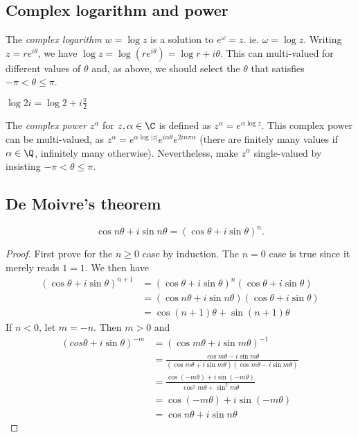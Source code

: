 \documentclass[a4paper]{article}
\begin{document}
\subsection{Complex logarithm and power}
\begin{defi}
  The \emph{complex logarithm} $w = \log z$ is a solution to $e^\omega = z$. ie. $\omega = \log z$. Writing $z = re^{i\theta}$, we have $\log z = \log(re^{i\theta}) = \log r + i\theta$. This can multi-valued for different values of $\theta$ and, as above, we should select the $\theta$ that satisfies $-\pi < \theta \leq \pi$.
\end{defi}
\begin{eg}
  $\log 2i = \log 2 + i\frac{\pi}{2}$
\end{eg}

\begin{defi}
  The \emph{complex power} $z^\alpha$ for $z, \alpha\in \C$ is defined as $z^\alpha = e^{\alpha\log z}$. This complex power can be multi-valued, as $z^\alpha = e^{\alpha\log|z|}e^{i\alpha\theta}e^{2in\pi\alpha}$ (there are finitely many values if $\alpha\in\Q$, infinitely many otherwise). Nevertheless, make $z^\alpha$ single-valued by insisting $-\pi < \theta \leq \pi$.
\end{defi}

\subsection{De Moivre's theorem}
\begin{thm}
  \[
    \cos n\theta + i\sin n\theta = (\cos\theta + i\sin\theta)^n.
  \]
\end{thm}
\begin{proof}
  First prove for the $n \geq 0$ case by induction. The $n = 0$ case is true since it merely reads $1 = 1$. We then have
  \begin{align*}
    (\cos\theta + i\sin\theta)^{n + 1} &= (\cos\theta + i\sin\theta)^n (\cos\theta + i\sin\theta)\\
    &= (\cos n\theta + i\sin n\theta )(\cos\theta + i\sin\theta)\\
    &= \cos(n+1)\theta + \sin(n+1)\theta
  \end{align*}
  If $n < 0$, let $m = -n$. Then $m > 0$ and
  \begin{align*}
    (cos\theta + i\sin\theta)^{-m} &= (\cos m\theta + i\sin m\theta)^{-1}\\
    &= \frac{\cos m\theta - i\sin m\theta}{(\cos m\theta + i\sin m\theta)(\cos m\theta - i\sin m\theta)}\\
    &= \frac{\cos (-m\theta) + i\sin (-m\theta)}{\cos^2 m\theta + \sin^2 m\theta}\\
    &= \cos (-m\theta) + i\sin (-m\theta)\\
    &= \cos n\theta + i\sin n\theta
  \end{align*}
\end{proof}
\end{document}
